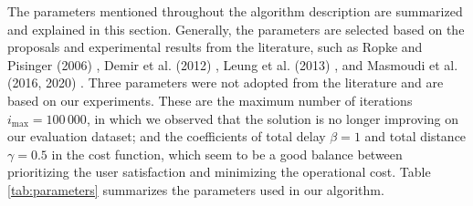     The parameters mentioned throughout the algorithm description are summarized and explained in this section. Generally, the parameters are selected based on the proposals and experimental results from the literature, such as  Ropke and Pisinger (2006) \cite{Ropke2006}, Demir et al. (2012) \cite{Demir2012}, Leung et al. (2013) \cite{Leung2013}, and Masmoudi et al. (2016, 2020) \cite{Masmoudi2016, Masmoudi2020}. Three parameters were not adopted from the literature and are based on our experiments. These are the maximum number of iterations $i_{\mathrm{max}} = 100\,000$, in which we observed that the solution is no longer improving on our evaluation dataset; and the coefficients of total delay $\beta = 1$ and total distance $\gamma = 0.5$ in the cost function, which seem to be a good balance between prioritizing the user satisfaction and minimizing the operational cost. Table \ref{tab:parameters} summarizes the parameters used in our algorithm.
    
